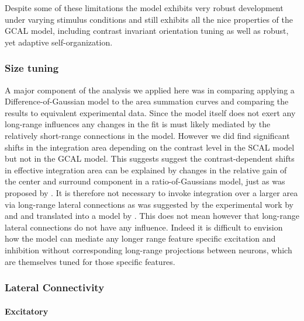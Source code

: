 Despite some of these limitations the model exhibits very robust
development under varying stimulus conditions and still exhibits all
the nice properties of the GCAL model, including contrast invariant
orientation tuning as well as robust, yet adaptive self-organization.

\subsubsection{Size tuning}

A major component of the analysis we applied here was in comparing
applying a Difference-of-Gaussian model to the area summation curves
and comparing the results to equivalent experimental data. Since the
model itself does not exert any long-range influences any changes in
the fit is must likely mediated by the relatively short-range
connections in the model. However we did find significant shifts in
the integration area depending on the contrast level in the SCAL model
but not in the GCAL model. This suggests suggest the 
contrast-dependent shifts in effective integration area can be explained by
changes in the relative gain of the center and surround component in a
ratio-of-Gaussians model, just as was proposed by
\cite{Cavanaugh2002}. It is therefore not necessary to invoke
integration over a larger area via long-range lateral connections as
was suggested by the experimental work by \cite{Levitt2002} and
\cite{Sceniak2001} and translated into a model by
\cite{Schwabe2006}. This does not mean however that long-range lateral
connections do not have any influence. Indeed it is difficult to
envision how the model can mediate any longer range feature specific
excitation and inhibition without corresponding long-range projections
between neurons, which are themselves tuned for those specific
features.

\subsubsection{Lateral Connectivity}

\paragraph{Excitatory}

